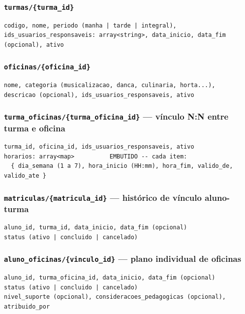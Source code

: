 \documentclass[a4paper,11pt]{article}
\begin{document}
\subsubsection*{\texttt{turmas/\{turma\_id\}}}

\begin{verbatim}
codigo, nome, periodo (manha | tarde | integral),
ids_usuarios_responsaveis: array<string>, data_inicio, data_fim (opcional), ativo
\end{verbatim}

\subsubsection*{\texttt{oficinas/\{oficina\_id\}}}

\begin{verbatim}
nome, categoria (musicalizacao, danca, culinaria, horta...),
descricao (opcional), ids_usuarios_responsaveis, ativo
\end{verbatim}

\subsubsection*{\texttt{turma\_oficinas/\{turma\_oficina\_id\}} --- vínculo N:N entre turma e oficina}

\begin{verbatim}
turma_id, oficina_id, ids_usuarios_responsaveis, ativo
horarios: array<map>          EMBUTIDO -- cada item:
  { dia_semana (1 a 7), hora_inicio (HH:mm), hora_fim, valido_de, valido_ate }
\end{verbatim}

\subsubsection*{\texttt{matriculas/\{matricula\_id\}} --- histórico de vínculo aluno-turma}

\begin{verbatim}
aluno_id, turma_id, data_inicio, data_fim (opcional)
status (ativo | concluido | cancelado)
\end{verbatim}

\subsubsection*{\texttt{aluno\_oficinas/\{vinculo\_id\}} --- plano individual de oficinas}

\begin{verbatim}
aluno_id, turma_oficina_id, data_inicio, data_fim (opcional)
status (ativo | concluido | cancelado)
nivel_suporte (opcional), consideracoes_pedagogicas (opcional), atribuido_por
\end{verbatim}
\end{document}
